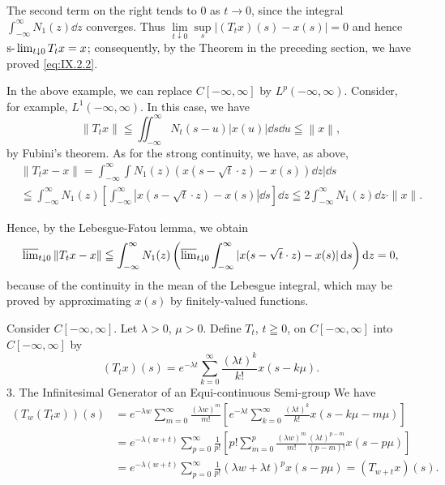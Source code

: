 The second term on the right tends to $0$ as $t \to 0$, since the integral $\int_{-\infty}^{\infty} N_1(z) \dd z$ converges. Thus $\lim\limits_{t \downarrow 0} \sup\limits_s |(T_t x)(s) - x(s)| = 0$ and hence $\text{s-}\lim\nolimits_{t \downarrow 0} T_t x = x$; consequently, by the Theorem in the preceding section, we have proved \eqref{eq:IX.2.2}. 

In the above example, we can replace $C[-\infty, \infty]$ by $L^p(-\infty, \infty)$. Consider, for example, $L^1(-\infty, \infty)$. In this case, we have 
\[
\left\| T _{t} x \right\| \leqq \iint_{- \infty} ^{\infty} N _{t} (s - u) | x (u) | \dd s \dd u \leqq \left\| x \right\|,
\]
by Fubini's theorem. As for the strong continuity, we have, as above, 
\[
\begin{aligned}
&\| T _{t} x - x \|  = \int_{- \infty} ^{\infty} \int N _{1} (z) (x (s - \sqrt {t} \cdot z) - x (s)) \dd z | \dd s \\
&\leqq \int_{- \infty} ^{\infty} N _{1} (z) \left[ \int_{- \infty} ^{\infty} | x (s - \sqrt {t} \cdot z) - x (s) | \dd s \right] \dd z \leqq 2 \int_{- \infty} ^{\infty} N _{1} (z) \dd z \cdot \| x \|.
\end{aligned}
\]

Hence, by the Lebesgue-Fatou lemma, we obtain 
\[
\varlimsup\nolimits_{t \downarrow 0} \| T _{t} x - x \| \leqq \int_{- \infty} ^{\infty} N _{1} (z) \left(\varlimsup\nolimits_{t \downarrow 0} \int_{- \infty} ^{\infty} | x (s - \sqrt {t} \cdot z) - x (s) | \mathop{}\!\mathrm{d} s\right) \mathop{}\!\mathrm{d} z = 0,
\]
because of the continuity in the mean of the Lebesgue integral, which may be proved by approximating $x(s)$ by finitely-valued functions. 

\begin{example}\label{ex:IX.2.Example.3} Consider $C[-\infty, \infty]$. Let $\lambda > 0$, $\mu > 0$. Define $T_t$, $t \geqq 0$, on $C[-\infty, \infty]$ into $C[-\infty, \infty]$ by 
\[
\left(T _{t} x\right) (s) = e ^{- \lambda t} \sum\limits_{k=0} ^{\infty} \frac {(\lambda t) ^{k}}{k !} x (s - k \mu).
\]
$3$. The Infinitesimal Generator of an Equi-continuous Semi-group We have 
\[
\begin{aligned}
\left(T _{w} (T _{t} x)\right) (s) &= e ^{- \lambda w} \sum\limits_{m=0} ^{\infty} \frac {(\lambda w) ^{m}}{m !} \left[ e ^{- \lambda t} \sum\limits_{k=0} ^{\infty} \frac {(\lambda t) ^{k}}{k !} x (s - k \mu - m \mu) \right]
\\
&= e ^{- \lambda (w + t)} \sum\limits_{p=0} ^{\infty} \frac {1}{p !} \left[ p! \sum\limits_{m=0} ^{p} \frac {(\lambda w) ^{m}}{m !} \frac {(\lambda t) ^{p-m}}{(p - m) !} x (s - p \mu) \right]
\\
&= e ^{- \lambda (w + t)} \sum\limits_{p=0} ^{\infty} \frac {1}{p !} (\lambda w + \lambda t) ^{p} x (s - p \mu) = (T _{w+t} x) (s).
\end{aligned}
\]
\end{example}


